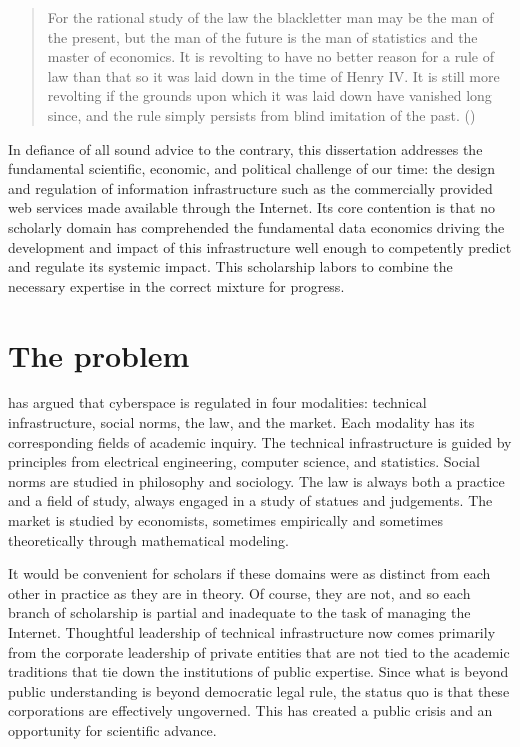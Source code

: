 \documentclass[../thesis.tex]{subfiles}
\begin{document}
 \begin{quote}
 For the rational study of the law the blackletter man may be the man of the present, but the man of the future is the man of statistics and the master of economics. It is revolting to have no better reason for a rule of law than that so it was laid down in the time of Henry IV. It is still more revolting if the grounds upon which it was laid down have vanished long since, and the rule simply persists from blind imitation of the past. (\citet{holmes1897path})
 \end{quote}
 
 In defiance of all sound advice to the contrary, this dissertation addresses the fundamental scientific, economic, and political challenge of our time: the design and regulation of information infrastructure such as the commercially provided web services made available through the Internet.
 Its core contention is that no scholarly domain has comprehended the fundamental data economics driving the development and impact of this infrastructure well enough to competently predict and regulate its systemic impact.
 This scholarship labors to combine the necessary expertise in the correct mixture for progress.

\section{The problem}
 
 \citet{lessig2009code} has argued that cyberspace is regulated
 in four modalities: technical infrastructure, social norms,
 the law, and the market.
 Each modality has its corresponding fields of academic inquiry.
 The technical infrastructure is guided by principles from
 electrical engineering, computer science, and statistics.
 Social norms are studied in philosophy and sociology.
 The law is always both a practice and a field of study,
 always engaged in a study of statues and judgements.
 The market is studied by economists, sometimes empirically
 and sometimes theoretically through mathematical modeling.

 It would be convenient for scholars if these domains were
 as distinct from each other in practice as they are in
 theory.
 Of course, they are not, and so each branch of scholarship
 is partial and inadequate to the task of managing the Internet.
 Thoughtful leadership of technical infrastructure now comes
 primarily from the corporate leadership of private entities
 that are not tied to the academic traditions that tie down
 the institutions of public expertise.
 Since what is beyond public understanding is beyond democratic
 legal rule, the status quo is that these corporations are
 effectively ungoverned.
 This has created a public crisis and an opportunity for
 scientific advance.
 
\end{document}
